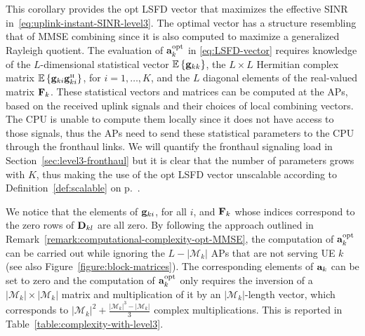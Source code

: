 This corollary provides the \gls{opt} LSFD vector that maximizes the effective SINR in~\eqref{eq:uplink-instant-SINR-level3}. The optimal vector has a structure resembling that of MMSE combining since it is also computed to maximize a generalized Rayleigh quotient.
The evaluation of ${\mathbf{a}}_{k}^{\rm opt}$ in \eqref{eq:LSFD-vector} requires knowledge of the $L$-dimensional statistical vector $\mathbb{E}\left\{  \mathbf{g}_{kk} \right\} $, the $L\times L$ Hermitian complex matrix $\mathbb{E} \left\{ {\vect{g}}_{ki} {\vect{g}}_{ki}^{\Htran}\right\}$, for $i=1,\ldots,K$, and the $L$ diagonal elements of the real-valued matrix ${\mathbf{F}}_{k}$. These statistical vectors and matrices can be computed at the APs, based on the received uplink signals and their choices of local combining vectors. The CPU is unable to compute them locally since it does not have access to those signals, thus the APs need to send these statistical parameters to the CPU through the fronthaul links. We will quantify the fronthaul signaling load in Section~\ref{sec:level3-fronthaul} but it is clear that the number of parameters grows with $K$, thus making the use of the opt LSFD vector unscalable according to Definition~\ref{def:scalable} on p.~\pageref{def:scalable}.

We notice that the elements of $\mathbf{g}_{ki}$, for all $i$, and $\mathbf{F}_k$ whose indices correspond to the zero rows of $\mathbf{D}_{kl}$ are all zero. By following the approach outlined in Remark~\ref{remark:computational-complexity-opt-MMSE}, the computation of ${\mathbf{a}}_{k}^{\rm opt}$ can be carried out while ignoring the $L - |\mathcal{M}_k|$ APs that are not serving UE $k$  (see also Figure~\ref{figure:block-matrices}).
The corresponding elements of $\mathbf{a}_k$ can be set to zero
and the computation of $\mathbf{a}_k^{\rm opt}$  only requires the inversion of a $ |\mathcal{M}_k| \times |\mathcal{M}_k|$ matrix and multiplication of it by an $ |\mathcal{M}_k|$-length vector, which corresponds to $|\mathcal{M}_k|^2+\frac{|\mathcal{M}_k|^3-|\mathcal{M}_k|}{3}$ complex multiplications. This is reported in Table~\ref{table:complexity-with-level3}. 
 

